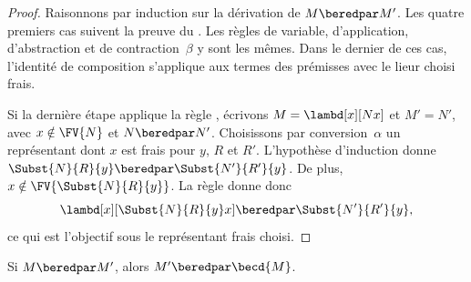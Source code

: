 \documentclass[../../../include/open-logic-section]{subfiles}
\begin{document}
\begin{proof}
Raisonnons par induction sur la dérivation
de $M\beredpar M'$. Les quatre premiers
cas suivent la preuve du
. Les règles de variable, d'application,
d'abstraction et de contraction~$\beta$ y sont les mêmes.
Dans le dernier de ces cas, l'identité de composition
s'applique aux termes des prémisses avec le lieur choisi frais.

Si la dernière étape applique la règle
, écrivons
$M=\lambd[x][Nx]$ et $M'=N'$, avec
$x\notin\FV{N}$ et $N\beredpar N'$.
Choisissons par conversion~$\alpha$ un
représentant dont $x$ est frais pour
$y$, $R$ et $R'$. L'hypothèse
d'induction donne
$\Subst{N}{R}{y}\beredpar
\Subst{N'}{R'}{y}$.
De plus, $x\notin\FV{\Subst{N}{R}{y}}$.
La règle 
donne donc
\[
  \lambd[x][\Subst{N}{R}{y}x]
  \beredpar \Subst{N'}{R'}{y},
\]
ce qui est l'objectif sous le
représentant frais choisi.
\end{proof}

\begin{lem}
Si $M \beredpar M'$, alors
$M'\beredpar\becd{M}$.
\end{lem}
\end{document}
